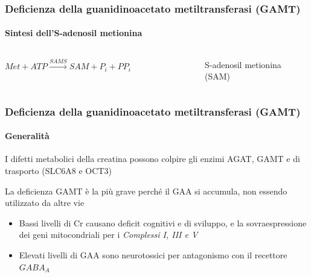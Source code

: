 \begin{frame}
\frametitle {Deficienza della guanidinoacetato metiltransferasi (GAMT)}
\framesubtitle {Sintesi dell'S-adenosil metionina}
\begin{columns}
	$Met + ATP \xrightarrow{SAMS} SAM + P_i + PP_i$
	\begin{figure}
	\end{figure}
	\centering S-adenosil metionina (SAM)
\end{columns}


\end{frame}

\begin{frame}
\frametitle {Deficienza della guanidinoacetato metiltransferasi (GAMT)}
\framesubtitle {Generalit\`a}

I difetti metabolici della creatina possono colpire gli enzimi AGAT, GAMT e di trasporto (SLC6A8 e OCT3)

La deficienza GAMT \`e la pi\`u grave perch\'e il \alert{GAA si accumula}, non essendo utilizzato da altre vie

\begin{itemize}
	\item Bassi livelli di Cr causano deficit cognitivi e di sviluppo, e la sovraespressione dei geni mitocondriali per i \emph{Complessi I, III e V}
	\item Elevati livelli di GAA sono neurotossici per antagonismo con il recettore $GABA_A$
\end{itemize}

\end{frame}

